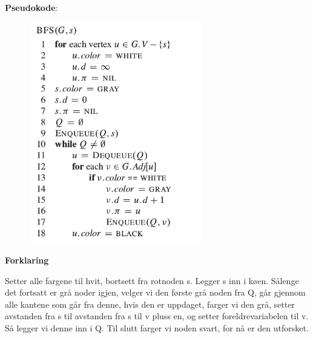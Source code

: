 \documentclass[12pt]{report}
\begin{document}
\vspace{\baselineskip}
\begin{multicols}{2}
{\fontsize{13pt}{15.6pt}\selectfont \textbf{Pseudokode}:\par}\par




\begin{figure}[H]
	\begin{Center}
		\includegraphics[width=2.98in,height=3.8in]{./media/image97.png}
	\end{Center}
\end{figure}



\par

{\fontsize{13pt}{15.6pt}\selectfont \textbf{Forklaring}\par}\par


\end{multicols}
Setter alle fargene til hvit, bortsett fra rotnoden s. Legger s inn i køen. Sålenge det fortsatt er grå noder igjen, velger vi den første grå noden fra Q, går gjennom alle kantene som går fra denne, hvis den er uppdaget, farger vi den grå, setter avstanden fra s til avstanden fra s til v pluss en, og setter foreldrevariabelen til v. Så legger vi denne inn i Q. Til slutt farger vi noden svart, for nå er den utforsket.\par
\end{document}
